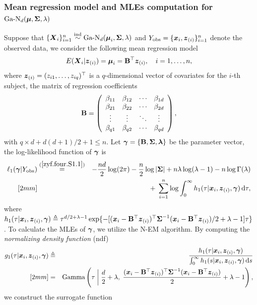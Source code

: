 \subsubsection{Mean regression model and MLEs computation for $\mbox{Ga-N}_d({\boldsymbol{\mu}}, {\mbox{\boldmath$\Sigma$}}, \lambda)$}\label{zyf.four.S.sec:GaN}     %

Suppose that $\{{\boldsymbol{X}}_i\}_{i=1}^n \stackrel{{\rm ind}}{\sim} \mbox{Ga-N}_d({\boldsymbol{\mu}}_i, {\mbox{\boldmath$\Sigma$}}, \lambda)$ and $Y_{\rm obs} = \{{\boldsymbol{x}}_i, {\boldsymbol{z}}_{(i)}\}_{i=1}^n$ denote the observed data, we consider the following mean regression model
$$
    E({\boldsymbol{X}}_i | {\boldsymbol{z}}_{(i)}) = {\boldsymbol{\mu}}_i = {\bf B}^\top {\boldsymbol{z}}_{(i)}, \quad i = 1, \dots, n, 
$$
where ${\boldsymbol{z}}_{(i)} = (z_{i1}, \dots, z_{iq})^\top$ is a $q$-dimensional vector of covariates for the $i$-th subject, the matrix of regression coefficients
\begin{eqnarray*}
    {\bf B} = \left(
    \begin{array}{cccc}
        \beta_{11} & \beta_{12} & \cdots & \beta_{1d} \\ 
        \beta_{21} & \beta_{22} & \cdots & \beta_{2d} \\ 
        \vdots   & \vdots   & \ddots & \vdots   \\
        \beta_{q1} & \beta_{q2} & \cdots & \beta_{qd}
    \end{array}
    \right),
\end{eqnarray*}
with $q \times d + d(d + 1) / 2 + 1 \le n$. Let ${\boldsymbol{\gamma}} = \{ {\bf B}, {\mbox{\boldmath$\Sigma$}}, {\boldsymbol{\lambda}}\}$ be the parameter vector, the log-likelihood function of ${\boldsymbol{\gamma}}$ is
\begin{eqnarray*}
    \ell_1({\boldsymbol{\gamma}} | Y_{\rm obs}) &\stackrel{\rm (\ref{zyf.four.S1.1})}{=}& -\frac{nd}{2} \log(2\pi) - \frac{n}{2} \log|{\mbox{\boldmath$\Sigma$}}| + n\lambda\log(\lambda - 1) -n\log\Gamma(\lambda) \\ [2mm]
    && +\; \sum_{i=1}^n \log \int_0^\infty h_1(\tau | {\boldsymbol{x}}_i, {\boldsymbol{z}}_{(i)}, {\boldsymbol{\gamma}}) \,\mbox{d} \tau,
\end{eqnarray*}
where $h_1(\tau | {\boldsymbol{x}}_i, {\boldsymbol{z}}_{(i)}, {\boldsymbol{\gamma}}) \triangleq \tau^{d/2 + \lambda - 1} \exp\{-[({\boldsymbol{x}}_i - {\bf B}^\top {\boldsymbol{z}}_{(i)})^\top {\mbox{\boldmath$\Sigma$}}^{-1} ({\boldsymbol{x}}_i - {\bf B}^\top {\boldsymbol{z}}_{(i)})/2 + \lambda - 1]\tau\}$. To calculate the MLEs of ${\boldsymbol{\gamma}}$, we utilize the N-EM algorithm. By computing the \textit{normalizing density function} (ndf)
\begin{eqnarray*}
    g_1(\tau | {\boldsymbol{x}}_i, {\boldsymbol{z}}_{(i)}, {\boldsymbol{\gamma}}) &\triangleq& \frac{h_1(\tau | {\boldsymbol{x}}_i, {\boldsymbol{z}}_{(i)}, {\boldsymbol{\gamma}})}{\int_0^\infty h_1(s | {\boldsymbol{x}}_i, {\boldsymbol{z}}_{(i)}, {\boldsymbol{\gamma}}) \,\mbox{d} s} \\ [2mm]
    &=& \mbox{Gamma}\left( \tau \;\bigg|\; \frac{d}{2} + \lambda,\; \frac{({\boldsymbol{x}}_i - {\bf B}^\top{\boldsymbol{z}}_{(i)})^\top {\mbox{\boldmath$\Sigma$}}^{-1} ({\boldsymbol{x}}_i - {\bf B}^\top {\boldsymbol{z}}_{(i)})}{2} + \lambda - 1 \right),
\end{eqnarray*}
we construct the surrogate function 
